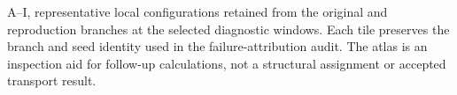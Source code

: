 A--I, representative local configurations retained from the original and reproduction branches at the selected diagnostic windows. Each tile preserves the branch and seed identity used in the failure-attribution audit. The atlas is an inspection aid for follow-up calculations, not a structural assignment or accepted transport result.
